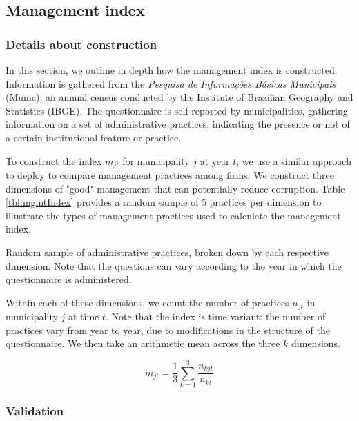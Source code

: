 \documentclass[12pt,a4paper]{article}
\theoremstyle{definition}
\begin{document}
{\subsection{Management index} \label{app:mgmt}

\subsubsection*{Details about construction}

In this section, we outline in depth how the management index is constructed. Information is gathered from the \textit{Pesquisa de Informações Básicas Municipais} (Munic), an annual census conducted by the Institute of Brazilian Geography and Statistics (IBGE). The questionnaire is self-reported by municipalities, gathering information on a set of administrative practices, indicating the presence or not of a certain institutional feature or practice.

To construct the index $m_{jt}$ for municipality $j$ at year $t$, we use a similar approach to \cite{Bloom2007} deploy to compare management practices among firms. We construct three dimensions of "good" management that can potentially reduce corruption. Table \ref{tbl:mgmtIndex} provides a random sample of 5 practices per dimension to illustrate the types of management practices used to calculate the management index.

\begin{table}[H]
	
	\caption{Random sample of administrative practices, broken down by each respective dimension. Note that the questions can vary according to the year in which the questionnaire is administered.}
	\label{tbl:mgmtIndex}
\end{table}

Within each of these dimensions, we count the number of practices $n_{jt}$  in municipality $j$ at time $t$. Note that the index is time variant: the number of practices vary from year to year, due to modifications in the structure of the questionnaire. We then take an arithmetic mean across the three $k$ dimensions.

$$m_{jt} = \frac{1}{3} \sum_{k = 1}^{3} \frac{n_{kjt}}{n_{kt}}$$

\subsubsection*{Validation}

}
\end{document}
